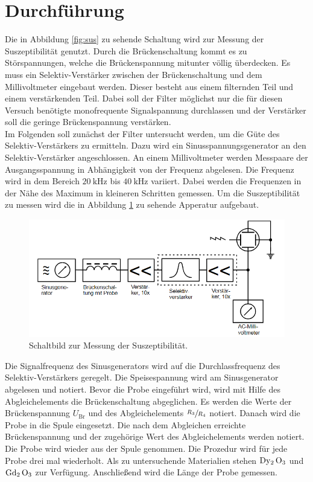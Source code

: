 \section{Durchführung}
\label{sec:Durchführung}
Die in Abbildung \ref{fig:sus} zu sehende Schaltung wird zur Messung der Suszeptibilität genutzt.
Durch die Brückenschaltung kommt es zu Störspannungen, welche die Brückenspannung mitunter völlig überdecken. Es muss ein Selektiv-Verstärker zwischen der Brückenschaltung und dem Millivoltmeter eingebaut werden.
Dieser besteht aus einem filternden Teil und einem verstärkenden Teil. Dabei soll der Filter möglichst nur die für diesen Versuch benötigte monofrequente Signalspannung durchlassen und der Verstärker 
soll die geringe Brückenspannung verstärken.
\\
Im Folgenden soll zunächst der Filter untersucht werden, um die Güte des Selektiv-Verstärkers zu ermitteln.
Dazu wird ein Sinusspannungsgenerator an den Selektiv-Verstärker angeschlossen. An einem Millivoltmeter werden Messpaare der Ausgangsspannung in Abhängigkeit von der
Frequenz abgelesen. Die Frequenz wird in dem Bereich $\SI{20}{\kilo \hertz}$ bis $\SI{40}{\kilo \hertz}$ variiert. Dabei werden die Frequenzen in der Nähe des Maximum in kleineren Schritten gemessen.
Um die Suszeptibilität zu messen wird die in Abbildung \ref{fig:AU} zu sehende Apperatur aufgebaut.
\begin{figure}
    \centering
    \includegraphics[scale=0.4]{pics/AU.png}
    \caption{Schaltbild zur Messung der Suszeptibilität. \cite{v606}}
    \label{fig:AU}
  \end{figure}
  Die Signalfrequenz des Sinusgenerators wird auf die Durchlassfrequenz des Selektiv-Verstärkers geregelt. Die Speisespannung wird am Sinusgenerator abgelesen und notiert.
  Bevor die Probe eingeführt wird, wird mit Hilfe des Abgleichelements die Brückenschaltung abgeglichen. Es werden die Werte der Brückenspannung $U_\text{Br}$ und des Abgleichelements $\sfrac{R_3}{R_4}$ notiert.
  Danach wird die Probe in die Spule eingesetzt. Die nach dem Abgleichen erreichte Brückenspannung und der zugehörige Wert des Abgleichelements werden notiert.
  Die Probe wird wieder aus der Spule genommen. Die Prozedur wird für jede Probe drei mal wiederholt. Als zu untersuchende Materialien stehen $\ce{Dy2 O3}$ und $\ce{Gd2 O3}$ zur Verfügung.
  Anschließend wird die Länge der Probe gemessen.
